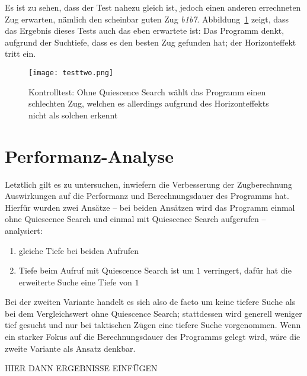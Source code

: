 Es ist zu sehen, dass der Test nahezu gleich ist, jedoch einen anderen errechneten Zug erwarten, nämlich den scheinbar guten Zug \textit{b1b7}. Abbildung~\ref{fig:testtwo} zeigt, dass das Ergebnis dieses Tests auch das eben erwartete ist: Das Programm denkt, aufgrund der Suchtiefe, dass es den besten Zug gefunden hat; der Horizonteffekt tritt ein.

\begin{figure}[H]
	\texttt{[image: testtwo.png]}
	\caption{Kontrolltest: Ohne Quiescence Search wählt das Programm einen schlechten Zug, welchen es allerdings aufgrund des Horizonteffekts nicht als solchen erkennt}
	\label{fig:testtwo}
\end{figure}

\section{Performanz-Analyse}
Letztlich gilt es zu untersuchen, inwiefern die Verbesserung der Zugberechnung Auswirkungen auf die Performanz und Berechnungsdauer des Programms hat. Hierfür wurden zwei Ansätze -- bei beiden Ansätzen wird das Programm einmal ohne Quiescence Search und einmal mit Quiescence Search aufgerufen -- analysiert:

\begin{enumerate}
	\item gleiche Tiefe bei beiden Aufrufen
	\item Tiefe beim Aufruf mit Quiescence Search ist um $1$ verringert, dafür hat die erweiterte Suche eine Tiefe von $1$
\end{enumerate}

Bei der zweiten Variante handelt es sich also de facto um keine tiefere Suche als bei dem Vergleichswert ohne Quiescence Search; stattdessen wird generell weniger tief gesucht und nur bei taktischen Zügen eine tiefere Suche vorgenommen. Wenn ein starker Fokus auf die Berechnungsdauer des Programms gelegt wird, wäre die zweite Variante als Ansatz denkbar.

HIER DANN ERGEBNISSE EINFÜGEN